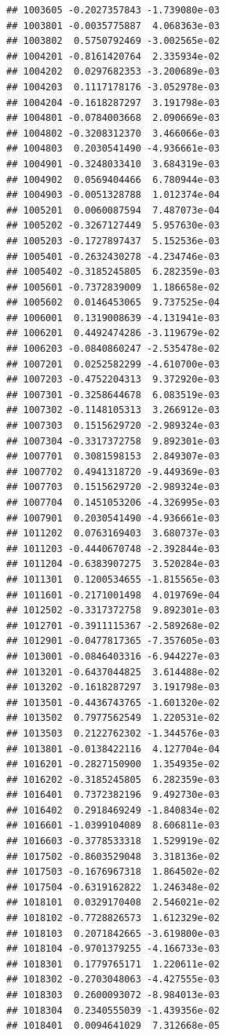 \begin{frame}[fragile]
\begin{verbatim}
## 1003605 -0.2027357843 -1.739080e-03
## 1003801 -0.0035775887  4.068363e-03
## 1003802  0.5750792469 -3.002565e-02
## 1004201 -0.8161420764  2.335934e-02
## 1004202  0.0297682353 -3.200689e-03
## 1004203  0.1117178176 -3.052978e-03
## 1004204 -0.1618287297  3.191798e-03
## 1004801 -0.0784003668  2.090669e-03
## 1004802 -0.3208312370  3.466066e-03
## 1004803  0.2030541490 -4.936661e-03
## 1004901 -0.3248033410  3.684319e-03
## 1004902  0.0569404466  6.780944e-03
## 1004903 -0.0051328788  1.012374e-04
## 1005201  0.0060087594  7.487073e-04
## 1005202 -0.3267127449  5.957630e-03
## 1005203 -0.1727897437  5.152536e-03
## 1005401 -0.2632430278 -4.234746e-03
## 1005402 -0.3185245805  6.282359e-03
## 1005601 -0.7372839009  1.186658e-02
## 1005602  0.0146453065  9.737525e-04
## 1006001  0.1319008639 -4.131941e-03
## 1006201  0.4492474286 -3.119679e-02
## 1006203 -0.0840860247 -2.535478e-02
## 1007201  0.0252582299 -4.610700e-03
## 1007203 -0.4752204313  9.372920e-03
## 1007301 -0.3258644678  6.083519e-03
## 1007302 -0.1148105313  3.266912e-03
## 1007303  0.1515629720 -2.989324e-03
## 1007304 -0.3317372758  9.892301e-03
## 1007701  0.3081598153  2.849307e-03
## 1007702  0.4941318720 -9.449369e-03
## 1007703  0.1515629720 -2.989324e-03
## 1007704  0.1451053206 -4.326995e-03
## 1007901  0.2030541490 -4.936661e-03
## 1011202  0.0763169403  3.680737e-03
## 1011203 -0.4440670748 -2.392844e-03
## 1011204 -0.6383907275  3.520284e-03
## 1011301  0.1200534655 -1.815565e-03
## 1011601 -0.2171001498  4.019769e-04
## 1012502 -0.3317372758  9.892301e-03
## 1012701 -0.3911115367 -2.589268e-02
## 1012901 -0.0477817365 -7.357605e-03
## 1013001 -0.0846403316 -6.944227e-03
## 1013201 -0.6437044825  3.614488e-02
## 1013202 -0.1618287297  3.191798e-03
## 1013501 -0.4436743765 -1.601320e-02
## 1013502  0.7977562549  1.220531e-02
## 1013503  0.2122762302 -1.344576e-03
## 1013801 -0.0138422116  4.127704e-04
## 1016201 -0.2827150900  1.354935e-02
## 1016202 -0.3185245805  6.282359e-03
## 1016401  0.7372382196  9.492730e-03
## 1016402  0.2918469249 -1.840834e-02
## 1016601 -1.0399104089  8.606811e-03
## 1016603 -0.3778533318  1.529919e-02
## 1017502 -0.8603529048  3.318136e-02
## 1017503 -0.1676967318  1.864502e-02
## 1017504 -0.6319162822  1.246348e-02
## 1018101  0.0329170408  2.546021e-02
## 1018102 -0.7728826573  1.612329e-02
## 1018103  0.2071842665 -3.619800e-03
## 1018104 -0.9701379255 -4.166733e-03
## 1018301  0.1779765171  1.220611e-02
## 1018302 -0.2703048063 -4.427555e-03
## 1018303  0.2600093072 -8.984013e-03
## 1018304  0.2340555039 -1.439356e-02
## 1018401  0.0094641029  7.312668e-05

\end{verbatim}
\end{frame}
